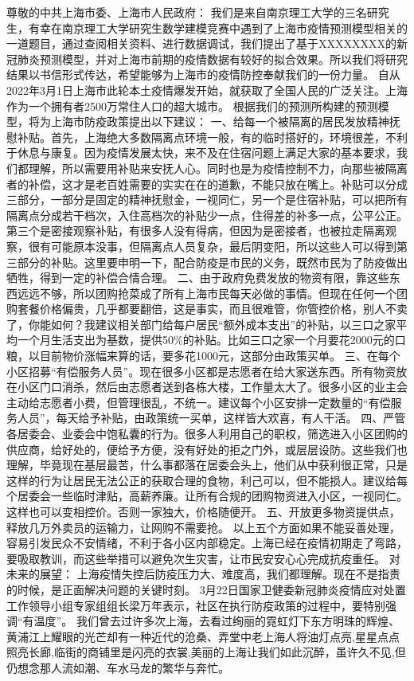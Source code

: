 \documentclass[bwprint]{gmcmthesis}
\numberwithin{figure}{section}
\begin{document}
尊敬的中共上海市委、上海市人民政府：
我们是来自南京理工大学的三名研究生，有幸在南京理工大学研究生数学建模竞赛中遇到了上海市疫情预测模型相关的一道题目，通过查阅相关资料、进行数据调试，我们提出了基于XXXXXXXX的新冠肺炎预测模型，并对上海市前期的疫情数据有较好的拟合效果。所以我们将研究结果以书信形式传达，希望能够为上海市的疫情防控奉献我们的一份力量。
自从2022年3月1日上海市此轮本土疫情爆发开始，就获取了全国人民的广泛关注。上海作为一个拥有者2500万常住人口的超大城市。
根据我们的预测所构建的预测模型，将为上海市防疫政策提出以下建议：
一、给每一个被隔离的居民发放精神抚慰补贴。首先，上海绝大多数隔离点环境一般，有的临时搭好的，环境很差，不利于休息与康复。因为疫情发展太快，来不及在住宿问题上满足大家的基本要求，我们都理解，所以需要用补贴来安抚人心。同时也是为疫情控制不力，向那些被隔离者的补偿，这才是老百姓需要的实实在在的道歉，不能只放在嘴上。补贴可以分成三部分，一部分是固定的精神抚慰金，一视同仁，另一个是住宿补贴，可以把所有隔离点分成若干档次，入住高档次的补贴少一点，住得差的补多一点，公平公正。第三个是密接观察补贴，有很多人没有得病，但因为是密接者，也被拉走隔离观察，很有可能原本没事，但隔离点人员复杂，最后阴变阳，所以这些人可以得到第三部分的补贴。这里要申明一下，配合防疫是市民的义务，既然市民为了防疫做出牺牲，得到一定的补偿合情合理。
二、由于政府免费发放的物资有限，靠这些东西远远不够，所以团购抢菜成了所有上海市民每天必做的事情。但现在任何一个团购套餐价格偏贵，几乎都要翻倍，这是事实，而且很难管，你管控价格，别人不卖了，你能如何？我建议相关部门给每户居民“额外成本支出”的补贴，以三口之家平均一个月生活支出为基数，提供50\%的补贴。比如三口之家一个月要花2000元的口粮，以目前物价涨幅来算的话，要多花1000元，这部分由政策买单。
三、在每个小区招募“有偿服务人员”。现在很多小区都是志愿者在给大家送东西。所有物资放在小区门口消杀，然后由志愿者送到各栋大楼，工作量太大了。很多小区的业主会主动给志愿者小费，但管理很乱，不统一。建议每个小区安排一定数量的“有偿服务人员”，每天给予补贴，由政策统一买单，这样皆大欢喜，有人干活。
四、严管各居委会、业委会中饱私囊的行为。很多人利用自己的职权，筛选进入小区团购的供应商，给好处的，便给予方便，没有好处的拒之门外，或层层设防。这些我们也理解，毕竟现在基层最苦，什么事都落在居委会头上，他们从中获利很正常，只是这样的行为让居民无法公正的获取合理的食物，利己可以，但不能损人。建议给每个居委会一些临时津贴，高薪养廉。让所有合规的团购物资进入小区，一视同仁。这样也可以变相控价。否则一家独大，价格随便开。
五、开放更多物资提供点，释放几万外卖员的运输力，让网购不需要抢。
以上五个方面如果不能妥善处理，容易引发民众不安情绪，不利于各小区内部稳定。上海已经在疫情初期走了弯路，要吸取教训，而这些举措可以避免次生灾害，让市民安安心心完成抗疫重任。
对未来的展望：
上海疫情失控后防疫压力大、难度高，我们都理解。现在不是指责的时候，是正面解决问题的关键时刻。
3月22日国家卫健委新冠肺炎疫情应对处置工作领导小组专家组组长梁万年表示，社区在执行防疫政策的过程中，要特别强调“有温度”。
    我们曾去过许多次上海，去看过绚丽的霓虹灯下东方明珠的辉煌、黄浦江上耀眼的光芒却有一种近代的沧桑、弄堂中老上海人将油灯点亮,星星点点照亮长廊,临街的商铺里是闪亮的衣裳,美丽的上海让我们如此沉醉，虽许久不见,但仍想念那人流如潮、车水马龙的繁华与奔忙。
\end{document}
